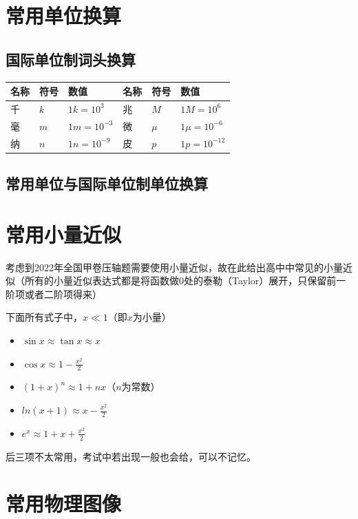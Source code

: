 \section{常用单位换算}

\subsection{国际单位制词头换算}

\begin{center}
\begin{tabular}{|l|l|l||l|l|l|}
\hline
\textbf{名称} & \textbf{符号} & \textbf{数值} & \textbf{名称} & \textbf{符号} & \textbf{数值} \\
\hline
千 & $k$ & $1k=10^3$ & 兆 & $M$ & $1M = 10^6$ \\
毫 & $m$ & $1m=10^{-3}$ & 微 & $\mu$ & $1\mu = 10^{-6}$\\
纳 & $n$ & $1n=10^{-9}$ & 皮 & $p$ & $1p = 10^{-12}$\\
\hline
\end{tabular}
\end{center}

\subsection{常用单位与国际单位制单位换算}

\section{常用小量近似}
\label{s_xljs}

考虑到2022年全国甲卷压轴题需要使用小量近似，故在此给出高中中常见的小量近似（所有的小量近似表达式都是将函数做0处的泰勒（Taylor）展开，只保留前一阶项或者二阶项得来）

下面所有式子中，$x \ll 1$（即$x$为小量）

\begin{itemize}
\item $\sin x \approx \tan x \approx x$
\item $\cos x \approx 1 - \frac{x^2}{2}$
\item $(1+x)^n \approx 1 + nx$（$n$为常数）
\item $ln(x+1) \approx x - \frac{x^2}{2}$
\item $e^x \approx 1 + x + \frac{x^2}{2}$
\end{itemize}

后三项不太常用，考试中若出现一般也会给，可以不记忆。

\section{常用物理图像}

